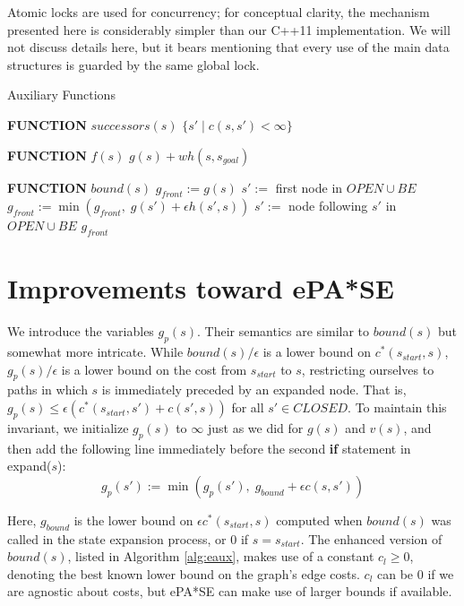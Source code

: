 \documentclass[letterpaper]{article}
\begin{document}
Atomic locks are used for concurrency; for conceptual clarity, the mechanism presented here is considerably simpler than our C++11 implementation. We will not discuss details here, but it bears mentioning that every use of the main data structures is guarded by the same global lock.

\begin{algorithm}
\caption{Auxiliary Functions}
\label{alg:aux}
\begin{algorithmic}
\STATE \textbf{FUNCTION} $successors(s)$
\RETURN $\{s' \mid c(s,s')<\infty\}$

\STATE \textbf{FUNCTION} $f(s)$
\RETURN $g(s) + wh(s,s_{goal})$

\STATE \textbf{FUNCTION} $bound(s)$
\STATE $g_{front} := g(s)$
\STATE $s' :=$ first node in $OPEN \cup BE$
\STATE $g_{front} := \min(g_{front},\;g(s') + \epsilon h(s',s))$
\STATE $s' :=$ node following $s'$ in $OPEN \cup BE$
\ENDWHILE
\RETURN $g_{front}$
\end{algorithmic}
\end{algorithm}

\section{Improvements toward ePA*SE}

We introduce the variables $g_p(s)$. Their semantics are similar to $bound(s)$ but somewhat more intricate. While $bound(s)/\epsilon$ is a lower bound on $c^*(s_{start},s)$, $g_p(s)/\epsilon$ is a lower bound on the cost from $s_{start}$ to $s$, restricting ourselves to paths in which $s$ is immediately preceded by an expanded node. That is, $g_p(s) \le \epsilon (c^*(s_{start},s') + c(s',s))$ for all $s'\in CLOSED$. To maintain this invariant, we initialize $g_p(s)$ to $\infty$ just as we did for $g(s)$ and $v(s)$, and then add the following line immediately before the second \textbf{if} statement in expand($s$):
\[g_p(s') := \min(g_p(s'),\; g_{bound} + \epsilon c(s,s'))\]

Here, $g_{bound}$ is the lower bound on $\epsilon c^*(s_{start},s)$ computed when $bound(s)$ was called in the state expansion process, or $0$ if $s=s_{start}$. The enhanced version of $bound(s)$, listed in Algorithm \ref{alg:eaux}, makes use of a constant $c_l \ge 0$, denoting the best known lower bound on the graph's edge costs. $c_l$ can be 0 if we are agnostic about costs, but ePA*SE can make use of larger bounds if available.
\end{document}
